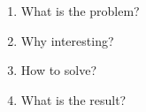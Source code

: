 
\newcommand{\bearbeiter}{Alina Elterman}

\newcommand{\titel}{Game-theoretic Analysis of Strategyproofness in Cake-cutting Protocols}

\newcommand{\beginndatum}{05. September 2011}
\newcommand{\abgabedatum}{05.~Dezember~2011}

\newcommand{\erstgutachter}{Prof. Dr.~J\"org Rothe}
\newcommand{\zweitgutachter}{Prof. Dr.~Peter Kern}

\newcommand{\zweiseitig}{\AUS}

\newcommand{\sprache}{englisch}



\begin{enumerate}
\item What is the problem?
\item Why interesting?
\item How to solve?
\item What is the result?
\end{enumerate}

